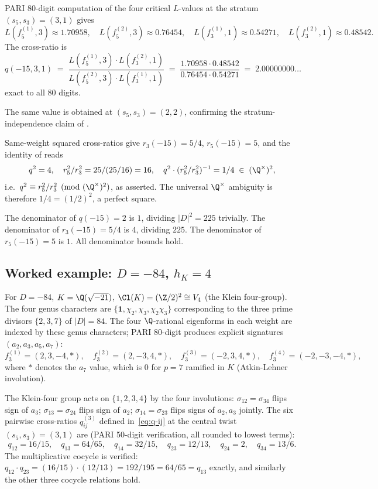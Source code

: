PARI 80-digit computation of the four critical $L$-values at the
stratum $(s_5, s_3) = (3, 1)$ gives
\[
L(f_5^{(1)}, 3) \approx 1.70958, \quad L(f_5^{(2)}, 3) \approx 0.76454,
\quad L(f_3^{(1)}, 1) \approx 0.54271, \quad L(f_3^{(2)}, 1) \approx 0.48542.
\]
The cross-ratio is
\[
q(-15, 3, 1)
\;=\; \frac{L(f_5^{(1)}, 3) \cdot L(f_3^{(2)}, 1)}
            {L(f_5^{(2)}, 3) \cdot L(f_3^{(1)}, 1)}
\;=\; \frac{1.70958 \cdot 0.48542}{0.76454 \cdot 0.54271}
\;=\; 2.00000000\dots
\]
exact to all $80$ digits.

The same value is obtained at $(s_5, s_3) = (2, 2)$, confirming
the stratum-independence claim of .

Same-weight squared cross-ratios give $r_3(-15) = 5/4$,
$r_5(-15) = 5$, and the identity of
 reads
\[
q^2 = 4, \quad r_5^2 / r_3^2 = 25 / (25/16) = 16, \quad
q^2 \cdot (r_5^2 / r_3^2)^{-1} = 1/4 \;\in\;(\Q^\times)^2,
\]
i.e.\ $q^2 \equiv r_5^2 / r_3^2 \pmod{(\Q^\times)^2}$, as
asserted. The universal $\Q^\times$ ambiguity is therefore
$1/4 = (1/2)^2$, a perfect square.

The denominator of $q(-15) = 2$ is $1$, dividing $|D|^2 = 225$
trivially. The denominator of $r_3(-15) = 5/4$ is $4$,
dividing $225$. The denominator of $r_5(-15) = 5$ is $1$. All
 denominator bounds hold.

\subsection{Worked example: $D = -84$, $h_K = 4$}\label{ss:example-D84}

For $D = -84$, $K = \Q(\sqrt{-21})$, $\Cl(K) = (\Z/2)^2 \cong V_4$
(the Klein four-group). The four genus characters are
$\{\mathbf{1}, \chi_2, \chi_3, \chi_2 \chi_3\}$ corresponding to
the three prime divisors $\{2, 3, 7\}$ of $|D| = 84$. The four
$\Q$-rational eigenforms in each weight are indexed by these
genus characters; PARI 80-digit produces explicit signatures
$(a_2, a_3, a_5, a_7)$:
\[
f_3^{(1)} = (2, 3, -4, *), \quad
f_3^{(2)} = (2, -3, 4, *), \quad
f_3^{(3)} = (-2, 3, 4, *), \quad
f_3^{(4)} = (-2, -3, -4, *),
\]
where $*$ denotes the $a_7$ value, which is $0$ for $p = 7$
ramified in $K$ (Atkin-Lehner involution).

The Klein-four group acts on $\{1, 2, 3, 4\}$ by the four
involutions:
$\sigma_{12} = \sigma_{34}$ flips sign of $a_3$;
$\sigma_{13} = \sigma_{24}$ flips sign of $a_2$;
$\sigma_{14} = \sigma_{23}$ flips signs of $a_2, a_3$ jointly.
The six pairwise cross-ratios $q_{ij}^{(3)}$ defined
in~\eqref{eq:q-ij} at the central twist $(s_5, s_3) = (3, 1)$
are (PARI 50-digit verification, all rounded to lowest terms):
\[
q_{12} = 16/15, \quad q_{13} = 64/65, \quad q_{14} = 32/15,
\quad q_{23} = 12/13, \quad q_{24} = 2, \quad q_{34} = 13/6.
\]
The multiplicative cocycle is verified:
$q_{12} \cdot q_{23} = (16/15) \cdot (12/13) = 192/195 = 64/65
= q_{13}$ exactly, and similarly the other three cocycle
relations hold.

